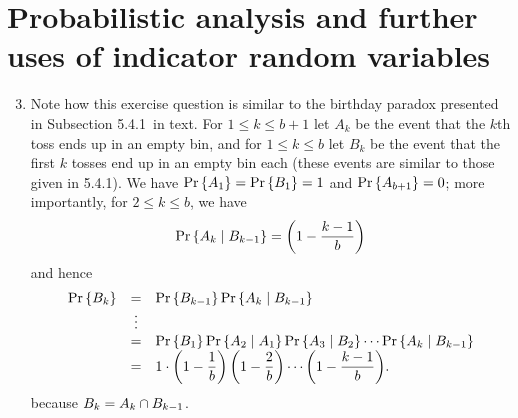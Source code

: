 \section{Probabilistic analysis and further uses of indicator random variables}
\begin{enumerate}[\thesection-1]
\setcounter{enumi}{2}
%
\item Note how this exercise question is similar to the birthday paradox presented in Subsection 5.4.1~in text. For $1 \leq k \leq b + 1$ let $A_k$ be the event that the $k$th toss ends up in an empty bin, and for $1 \leq k \leq b$ let $B_k$ be the event that the first $k$ tosses end up in an empty bin each (these events are similar to those given in 5.4.1). We have $\Pr\left\{A_1\right\} = \Pr\left\{B_1\right\} = 1$ and $\Pr\left\{A_{b + 1}\right\} = 0$; more importantly, for $2 \leq k \leq b$, we have
\[
\Pr\left\{A_k \mid B_{k - 1}\right\} = \left(1 - \frac{k - 1}{b}\right)
\]
and hence
\[
\begin{array}{lcl}
\Pr\left\{B_k\right\} & = & \Pr\left\{B_{k - 1}\right\} \Pr\left\{A_k \mid B_{k - 1}\right\} \cr
         & \vdots & \cr
         & = & \Pr\left\{B_1\right\} \Pr\left\{A_2 \mid A_1\right\} \Pr\left\{A_3 \mid B_2\right\} \cdots \Pr\left\{A_k \mid B_{k - 1}\right\} \cr
         & = & {\displaystyle1 \cdot \left(1 - \frac{1}{b}\right) \left(1 - \frac{2}{b}\right) \cdots \left(1 - \frac{k - 1}{b}\right)}. \cr
\end{array}
\]
because $B_k = A_k \cap B_{k - 1}$.


\end{enumerate}
